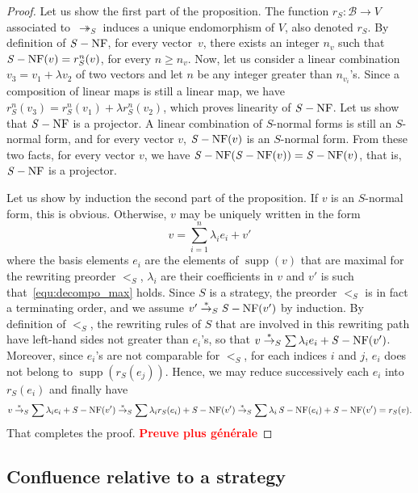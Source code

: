 \documentclass[10pt]{easychair}
\theoremstyle{definition}
\newcommand\todo[1]{{\bf\textcolor{red}{#1}}}
\DeclareMathOperator{\supp}{supp}
\newcommand\basis{\mathscr{B}}
\newcommand\ordS{<_S}
\newcommand\parS{\twoheadrightarrow_S}
\newcommand\transS{\overset{*}{\to}_S}
\DeclareMathOperator{\SNF}{{\it S}-NF}
\begin{document}
\begin{proof}
  Let us show the first part of the proposition. The function
  $r_S:\basis\to V$ associated to~$\parS$ induces a unique endomorphism
  of $V$, also denoted $r_S$. By definition of $\SNF$, for every  
  vector~$v$, there exists an integer $n_v$ such that
  $\SNF(v)=r_S^n(v)$, for every $n\geq n_v$. Now, let us consider a
  linear combination $v_3=v_1+\lambda v_2$ of two vectors and let $n$ be
  any integer greater than $n_{v_i}$'s. Since a composition of linear
  maps is still a linear map, we have
  $r_S^n(v_3)=r_S^n(v_1)+\lambda r_S^n(v_2)$, which proves linearity of
  $\SNF$. Let us show that $\SNF$ is a projector. A linear combination of
  $S$-normal forms is still an $S$-normal form, and for every vector $v$,
  $\SNF(v)$ is an $S$-normal form. From these two facts, for every vector
  $v$, we have $\SNF(\SNF(v))=\SNF(v)$, that is, $\SNF$ is a projector.

  Let us show by induction the second part of the proposition. If $v$ is
  an $S$-normal form, this is obvious. Otherwise, $v$ may be uniquely
  written in the form
  \begin{equation}\label{equ:decompo_max}
    v=\sum_{i=1}^n\lambda_ie_i+v'
  \end{equation}
  where the basis elements $e_i$ are the elements of $\supp(v)$ that are
  maximal for the rewriting preorder $\ordS$, $\lambda_i$ are their
  coefficients in $v$ and $v'$ is such that~\eqref{equ:decompo_max}
  holds. Since $S$ is a strategy, the preorder $\ordS$ is in fact a
  terminating order, and we assume $v'\transS\SNF(v')$ by induction. By
  definition of $<_S$, the rewriting rules of $S$ that are involved in
  this rewriting path have left-hand sides not greater than $e_i$'s, so
  that $v\transS\sum\lambda_ie_i+\SNF(v')$. Moreover, since $e_i$'s are
  not comparable for $\ordS$, for each indices $i$ and $j$, $e_i$ does
  not belong to $\supp(r_S(e_j))$. Hence, we may reduce successively each
  $e_i$ into $r_S(e_i)$ and finally have
  \[v\transS\sum\lambda_ie_i+\SNF(v')\transS\sum\lambda_ir_S(e_i)
  +\SNF(v')\transS\sum\lambda_i\SNF(e_i)+\SNF(v')
  =r_S(v).\]
  That completes the proof. \todo{Preuve plus générale}
\end{proof}

\subsection{Confluence relative to a strategy}
\label{sec:confluence_relative_to_a_strategy}
\end{document}
